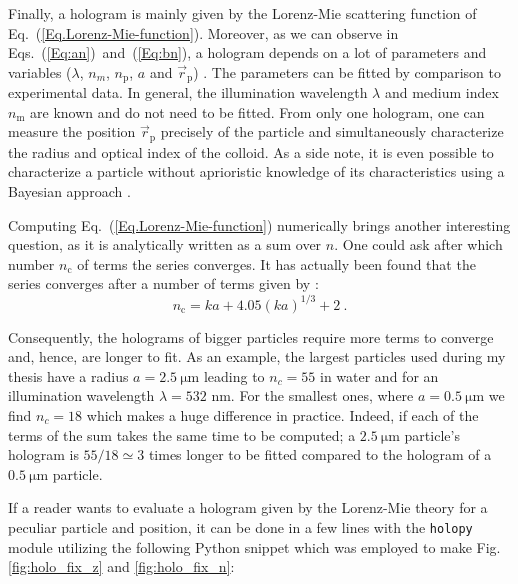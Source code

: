 Finally, a hologram is mainly given by the Lorenz-Mie scattering function of Eq.~(\ref{Eq.Lorenz-Mie-function}). Moreover, as we can observe in Eqs.~(\ref{Eq:an})~and~(\ref{Eq:bn}), a hologram depends on a lot of parameters and variables ($\lambda$, $n_m$, $n_\mathrm{p}$, $a$ and $\vec{r}_\mathrm{p}$) . The parameters can be fitted by comparison to experimental data. In general, the illumination wavelength $\lambda$ and medium index $n_\mathrm{m}$ are known and do not need to be fitted. From only one hologram, one can measure  the position $\vec{r}_\mathrm{p}$ precisely of the particle and simultaneously characterize the radius and optical index of the colloid. As a side note, it is even possible to characterize a particle without aprioristic knowledge of its characteristics using a Bayesian approach \cite{gregory_bayesian_2005, dimiduk_bayesian_2016}.

Computing Eq.~(\ref{Eq.Lorenz-Mie-function}) numerically brings another interesting question, as it is analytically written as a sum over $n$. One could ask after which number $n_\mathrm{c}$ of terms the series converges. It has actually been found that the series converges after a number of terms given by \cite{lentz_generating_1976}:
\begin{equation}
	n_\mathrm{c} = k a + 4.05 (k a)^{1/3} + 2 ~.
\end{equation}

Consequently, the holograms of bigger particles require more terms to converge and, hence, are longer to fit. As an example, the largest particles used during my thesis have a radius $a = 2.5 ~ \mathrm{\mu m}$ leading to $ n_c = 55$ in water and for an illumination wavelength $\lambda = 532$ nm. For the smallest ones, where $a = 0.5 ~ \mathrm{\mu m}$ we find $n_c = 18$ which makes a huge difference in practice. Indeed, if each of the terms of the sum takes the same time to be computed; a $2.5 ~ \mathrm{\mu m}$ particle's hologram is $55/18 \simeq 3$ times longer to be fitted compared to the hologram of a $0.5 ~ \mathrm{\mu m}$ particle.

If a reader wants to evaluate a hologram given by the Lorenz-Mie theory for a peculiar particle and position, it can be done in a few lines with the \texttt{holopy} module utilizing the following Python snippet which was employed to make Fig.\ref{fig:holo_fix_z} and \ref{fig:holo_fix_n}:

